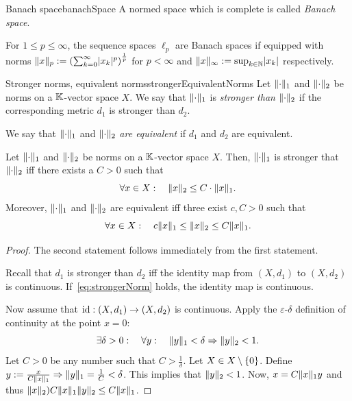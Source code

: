 \documentclass[language=english]{../../Template/TemplateLecture}
\begin{document}
\begin{defi}{Banach space}{banachSpace}
    A normed space which is complete is called \emph{Banach space}.
\end{defi}

\begin{beispiel}
    For $1 \leq p \leq \infty$, the sequence spaces $\ell_p$ are Banach spaces if equipped with norms $\lVert x\rVert_p := \left(\sum_{k = 0}^\infty \lvert x_k\rvert^p\right)^{\frac{1}{p}}$ for $p < \infty$ and $\lVert x\rVert_\infty := \sup_{k \in \mathbb{N}} \lvert x_k\rvert$ respectively.
\end{beispiel}

\begin{defi}{Stronger norms, equivalent norms}{strongerEquivalentNorms}
    Let $\lVert\cdot\rVert_1$ and $\lVert\cdot\rVert_2$ be norms on a $\mathbb{K}$-vector space $X$. We say that $\lVert\cdot\rVert_1$ is \emph{stronger than} $\lVert\cdot\rVert_2$ if the corresponding metric $d_1$ is stronger than $d_2$.

    We say that $\lVert\cdot\rVert_1$ and $\lVert\cdot\rVert_2$ \emph{are equivalent} if $d_1$ and $d_2$ are equivalent.
\end{defi}

\begin{prop}
    Let $\lVert\cdot\rVert_1$ and $\lVert\cdot\rVert_2$ be norms on a $\mathbb{K}$-vector space $X$. Then, $\lVert\cdot\rVert_1$ is stronger that $\lVert\cdot\rVert_2$ iff there exists a $C > 0$ such that 
    \begin{equation}
        \forall x \in X: \quad \lVert x\rVert_2 \leq C \cdot \lVert x\rVert_1.\label{eq:strongerNorm}
    \end{equation}
    Moreover, $\lVert\cdot\rVert_1$ and $\lVert\cdot\rVert_2$ are equivalent iff three exist $c, C > 0$ such that 
    \begin{equation}
        \forall x \in X: \quad c\lVert x\rVert_1 \leq \lVert x\rVert_2 \leq C\lVert x\rVert_1.
    \end{equation}
\end{prop}
\begin{proof}
    The second statement follows immediately from the first statement.

    Recall that $d_1$ is stronger than $d_2$ iff the identity map from $(X,d_1)$ to $(X,d_2)$ is continuous. If~\eqref{eq:strongerNorm} holds, the identity map is continuous.

    Now assume that $\operatorname{id}: (X,d_1) \to (X,d_2)$ is continuous. Apply the $\varepsilon$-$\delta$ definition of continuity at the point $x = 0$:
    \begin{equation}
        \exists \delta > 0: \quad \forall y: \quad \lVert y\rVert_1 < \delta \Rightarrow \lVert y\rVert_2 < 1.
    \end{equation}
    Let $C > 0$ be any number such that $C > \frac{1}{\delta}$. Let $X \in X \setminus \{0\}$. Define $y := \frac{x}{C\lVert x\rVert_1} \Rightarrow \lVert y\rVert_1 = \frac{1}{C} < \delta$. This implies that $\lVert y\rVert_2 < 1$. Now, $x = C\lVert x\rVert_1 y$ and thus $\lVert x\rVert_2 ) C\lVert x\rVert_1 \lVert y\rVert_2 \leq C\lVert x\rVert_1$. 
\end{proof}
\end{document}
